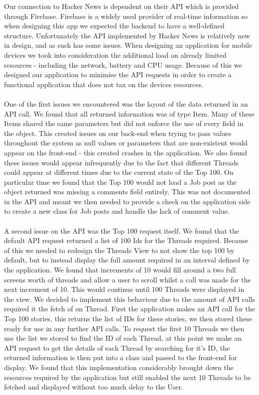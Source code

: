 \documentclass[11pt]{article}
\begin{document}
Our connection to Hacker News is dependent on their API which is provided through Firebase. Firebase is a widely used provider of real-time information so when designing this app we expected the backend to have a well-defined structure. Unfortunately the API implemented by Hacker News is relatively new in design, and as such has some issues. When designing an application for mobile devices we took into consideration the additional load on already limited resources - including the network, battery and CPU usage. Because of this we designed our application to minimise the API requests in order to create a functional application that does not tax on the devices resources.
\\
\\
One of the first issues we encountered was the layout of the data returned in an API call. We found that all returned information was of type Item. Many of these Items shared the same parameters but did not enforce the use of every field in the object. This created issues on our back-end when trying to pass values throughout the system as null values or parameters that are non-existent would appear on the front-end - this created crashes in the application. We also found these issues would appear infrequently due to the fact that different Threads could appear at different times due to the current state of the Top 100. On particular time we found that the Top 100 would not load a Job post as the object returned was missing a comments field entirely. This was not documented in the API and meant we then needed to provide a check on the application side to create a new class for Job posts and handle the lack of comment value.
\\
\\
A second issue on the API was the Top 100 request itself. We found that the default API request returned a list of 100 Ids for the Threads required. Because of this we needed to redesign the Threads View to not show the top 100 by default, but to instead display the full amount required in an interval defined by the application. We found that increments of 10 would fill around a two full screens worth of threads and allow a user to scroll whilst a call was made for the next increment of 10. This would continue until 100 Threads were displayed in the view. We decided to implement this behaviour due to the amount of API calls required it the fetch of on Thread. First the application makes an API call for the Top 100 stories, this returns the list of IDs for these stories, we then stored these ready for use in any further API calls. To request the first 10 Threads we then use the list we stored to find the ID of each Thread, at this point we make an API request to get the details of each Thread by searching for it’s ID, the returned information is then put into a class and passed to the front-end for display. We found that this implementation considerably brought down the resources required by the application but still enabled the next 10 Threads to be fetched and displayed without too much delay to the User.
\end{document}
